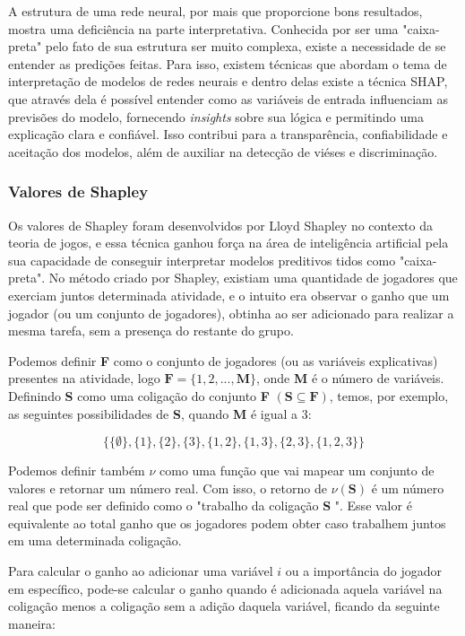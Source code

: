 A estrutura de uma rede neural, por mais que proporcione bons resultados, mostra uma deficiência na parte interpretativa. Conhecida por ser uma "caixa-preta" pelo fato de sua estrutura ser muito complexa, existe a necessidade de se entender as predições feitas.
Para isso, existem técnicas que abordam o tema de interpretação de modelos de redes neurais e dentro delas existe a técnica SHAP, que através dela é possível entender como as variáveis de entrada influenciam as previsões do modelo, fornecendo \textit{insights} sobre sua lógica e permitindo uma explicação clara e confiável. Isso contribui para a transparência, confiabilidade e aceitação dos modelos, além de auxiliar na detecção de viéses e discriminação. 

\subsubsection{Valores de Shapley}

Os valores de Shapley foram
desenvolvidos por Lloyd Shapley \cite{shapley1953value} no contexto da teoria de jogos, e essa técnica ganhou   força na área de inteligência artificial pela sua capacidade de conseguir interpretar modelos preditivos tidos como "caixa-preta". No método criado por Shapley, existiam uma quantidade de jogadores que exerciam juntos determinada atividade, e o intuito era observar o ganho que um jogador (ou um conjunto de jogadores), obtinha ao ser adicionado para realizar a mesma tarefa, sem a presença do restante do grupo. 

Podemos definir \textbf{F} como o conjunto de jogadores (ou as variáveis explicativas) presentes na atividade, logo $\textbf{F} = \{1,2,..., \textbf{M}\}$, onde \textbf{M} é o número de variáveis.
Definindo \textbf{S} como uma coligação do conjunto \textbf{F} $(\textbf{S} \subseteq \textbf{F})$, temos, por exemplo, as seguintes possibilidades de \textbf{S}, quando \textbf{M} é igual a 3:

$$ \{\{\emptyset\},\{1\},\{2\},\{3\},\{1,2\},\{1,3\},\{2,3\},\{1,2,3\}\}$$

Podemos definir também $\nu$ como uma função que vai mapear um conjunto de valores e retornar um número real. Com isso, o retorno de $\nu(\textbf{S})$ é um número real que pode ser definido como 
o "trabalho da coligação \textbf{S} ". Esse valor é equivalente ao total ganho que os jogadores podem obter caso trabalhem juntos em uma determinada coligação.

Para calcular o ganho ao adicionar uma variável $i$ ou a importância do jogador em específico, pode-se calcular o ganho quando é adicionada aquela variável na coligação menos a coligação sem a adição daquela variável, ficando da seguinte maneira:

